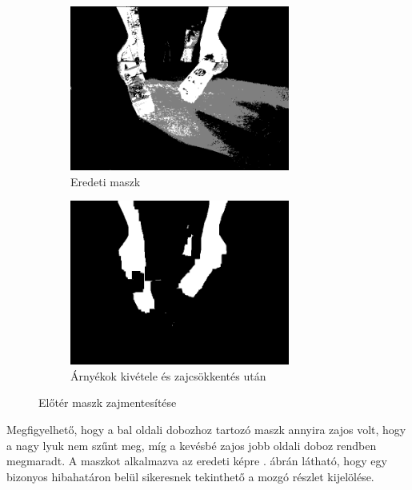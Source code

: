 \begin{figure}[tbh]
\centering
\begin{subfigure}[b]{.49\linewidth}
	\centering
	\includegraphics[width=205pt]{figures/mask343.png}
	\caption{Eredeti maszk}
  \end{subfigure}
\begin{subfigure}[b]{.49\linewidth}
	\centering
	\includegraphics[width=205pt]{figures/mask343_fixed.png}
	\caption{Árnyékok kivétele és zajcsökkentés után}
  \end{subfigure}
\caption{Előtér maszk zajmentesítése \label{fig:erosion_dilation}}
\end{figure}

Megfigyelhető, hogy a bal oldali dobozhoz tartozó maszk annyira zajos volt, hogy a nagy lyuk nem szűnt meg, míg a kevésbé zajos jobb oldali doboz rendben megmaradt. A maszkot alkalmazva az eredeti képre . ábrán látható, hogy egy bizonyos hibahatáron belül sikeresnek tekinthető a mozgó részlet kijelölése.


